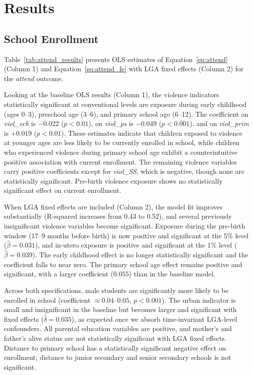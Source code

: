 
\section{Results}
\label{sec:results}

\subsection{School Enrollment}
\label{sec:results_attend}

Table~\ref{tab:attend_results} presents OLS estimates of
Equation~\eqref{eq:attend} (Column 1) and Equation~\eqref{eq:attend_fe}
with LGA fixed effects (Column 2) for the \textit{attend} outcome.

Looking at the baseline OLS results (Column 1), the violence indicators
statistically significant at conventional levels are exposure during early
childhood (ages 0--3), preschool age (3--6), and primary school age
(6--12). The coefficient on \textit{viol\_ech} is $-0.022$ ($p < 0.01$),
on \textit{viol\_ps} is $-0.049$ ($p < 0.001$), and on \textit{viol\_prim}
is $+0.019$ ($p < 0.01$). These estimates indicate that children exposed to
violence at younger ages are less likely to be currently enrolled in school,
while children who experienced violence during primary school age exhibit a
counterintuitive positive association with current enrollment. The remaining
violence variables carry positive coefficients except for
\textit{viol\_SS}, which is negative, though none are statistically
significant. Pre-birth violence exposure shows no statistically significant
effect on current enrollment.

When LGA fixed effects are included (Column 2), the model fit improves
substantially (R-squared increases from 0.43 to 0.52), and several
previously insignificant violence variables become significant. Exposure
during the pre-birth window (17--9 months before birth) is now positive
and significant at the 5\% level ($\hat{\beta} = 0.031$), and in-utero
exposure is positive and significant at the 1\% level ($\hat{\beta} =
0.039$). The early childhood effect is no longer statistically significant
and the coefficient falls to near zero. The primary school age effect
remains positive and significant, with a larger coefficient ($0.055$) than
in the baseline model.

Across both specifications, male students are significantly more likely to
be enrolled in school (coefficient $\approx 0.04$--$0.05$, $p < 0.001$).
The urban indicator is small and insignificant in the baseline but becomes
larger and significant with fixed effects ($\hat{\delta} = 0.035$), as
expected once we absorb time-invariant LGA-level confounders. All parental
education variables are positive, and mother's and father's alive status
are not statistically significant with LGA fixed effects. Distance to
primary school has a statistically significant negative effect on
enrollment; distance to junior secondary and senior secondary schools is
not significant.

